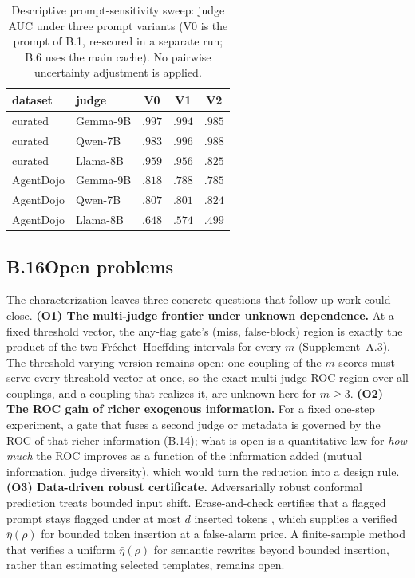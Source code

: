 \begin{table}[t]
\caption{Descriptive prompt-sensitivity sweep: judge AUC under three prompt
variants (V0 is the prompt of B.1, re-scored in a separate run; B.6 uses the main cache). No pairwise uncertainty adjustment is
applied.}
\label{tab:promptsweep}
\centering\small\setlength{\tabcolsep}{4pt}
\begin{tabular}{@{}llccc@{}}
\toprule
dataset & judge & V0 & V1 & V2 \\
\midrule
curated & Gemma-9B & $.997$ & $.994$ & $.985$ \\
curated & Qwen-7B  & $.983$ & $.996$ & $.988$ \\
curated & Llama-8B & $.959$ & $.956$ & $.825$ \\
\addlinespace
AgentDojo & Gemma-9B & $.818$ & $.788$ & $.785$ \\
AgentDojo & Qwen-7B  & $.807$ & $.801$ & $.824$ \\
AgentDojo & Llama-8B & $.648$ & $.574$ & $.499$ \\
\bottomrule
\end{tabular}
\end{table}

\subsection*{B.16\quad Open problems}
The characterization leaves three concrete questions that follow-up work could close.
\textbf{(O1) The multi-judge frontier under unknown dependence.} At a fixed
threshold vector, the any-flag gate's (miss, false-block) region is exactly the
product of the two Fr\'echet--Hoeffding intervals for every $m$ (Supplement~A.3).
The threshold-varying version remains open: one coupling of the $m$ scores must serve
every threshold vector at once, so the exact multi-judge ROC region over all
couplings, and a coupling that realizes it, are unknown here for $m\ge3$. \textbf{(O2) The ROC gain of richer exogenous
information.} For a fixed one-step experiment, a gate that fuses
a second judge or metadata is governed by the ROC of that richer information
(B.14); what is open is a quantitative law for \emph{how much} the ROC
improves as a function of the information added (mutual information, judge diversity),
which would turn the reduction into a design rule.
\textbf{(O3) Data-driven robust certificate.} Adversarially robust conformal
prediction \citep{gendler2022robustconformal} treats bounded input shift. Erase-and-check certifies that a flagged prompt stays flagged under at most $d$
inserted tokens \citep{kumar2024certifying}, which supplies a verified
$\bar\eta(\rho)$ for bounded token insertion at a false-alarm price. A
finite-sample method that verifies a uniform $\bar\eta(\rho)$ for semantic
rewrites beyond bounded insertion, rather than estimating selected templates,
remains open.

